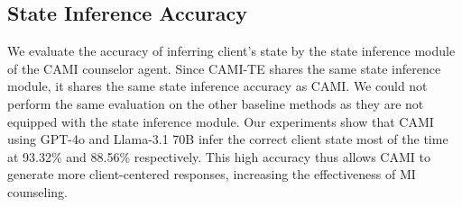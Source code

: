 \subsection{State Inference Accuracy}
\label{sec:state_inf_accuracy}

We evaluate the accuracy of inferring client's state by the state inference module of the CAMI counselor agent.  Since CAMI-TE shares the same state inference module, it shares the same state inference accuracy as CAMI. We could not perform the same evaluation on the other baseline methods as they are not equipped with the state inference module. Our experiments show that CAMI using GPT-4o and Llama-3.1 70B infer the correct client state most of the time at 93.32\% and 88.56\% respectively.  This high accuracy thus allows CAMI to generate more client-centered responses, increasing the effectiveness of MI counseling.

